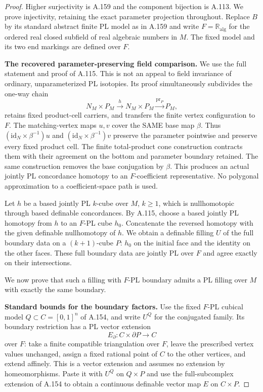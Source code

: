 \begin{proof}
Higher surjectivity is A.159 and the component bijection is
A.113. We prove injectivity, retaining the exact parameter
projection throughout. Replace $B$ by its standard abstract
finite PL model as in A.159 and write $F=\mathbb R_{\mathrm{alg}}$
for the ordered real closed subfield of real algebraic numbers
in $M$. The fixed model and its two end markings are defined
over $F$.

\textbf{The recovered parameter-preserving field comparison.}\quad
We use the full statement and proof of A.115. This is not an
appeal to field invariance of ordinary, unparameterized PL
isotopies. Its proof simultaneously subdivides the one-way
chain
\[
 N_M\times P_M\xrightarrow{h}N_M\times P_M
                  \xrightarrow{\operatorname{pr}_P}P_M,
\]
retains fixed product-cell carriers, and transfers the finite
vertex configuration to $F$. The matching-vertex maps $u,v$
cover the SAME base map $\beta$. Thus
$(\mathrm{id}_N\times\beta^{-1})u$ and
$(\mathrm{id}_N\times\beta^{-1})v$ preserve the parameter
pointwise and preserve every fixed product cell.
The finite total-product cone construction contracts them
with their agreement on the bottom and parameter boundary
retained. The same construction removes the base conjugation
by $\beta$. This produces an actual jointly PL concordance
homotopy to an $F$-coefficient representative. No polygonal
approximation to a coefficient-space path is used.

Let $h$ be a based jointly PL $k$-cube over $M$, $k\ge1$,
which is nullhomotopic through based definable concordances.
By A.115, choose a based jointly PL homotopy from $h$ to
an $F$-PL cube $h_0$. Concatenate the reversed homotopy
with the given definable nullhomotopy of $h$. We obtain a
definable filling $U$ of the full boundary data on a
$(k+1)$-cube $P$: $h_0$ on the initial face and the identity
on the other faces. These full boundary data are jointly PL
over $F$ and agree exactly on their intersections.

We now prove that such a filling with $F$-PL boundary admits
a PL filling over $M$ with exactly the same boundary.

\textbf{Standard bounds for the boundary factors.}\quad
Use the fixed $F$-PL cubical model $Q\subset C=[0,1]^n$ of
A.154, and write $U^Q$ for the conjugated family.
Its boundary restriction has a PL vector extension
\[
 E_\partial:C\times\partial P\longrightarrow C
\]
over $F$: take a finite compatible triangulation over $F$,
leave the prescribed vertex values unchanged, assign a
fixed rational point of $C$ to the other vertices, and
extend affinely. This is a vector extension and assumes
no extension by homeomorphisms. Paste it with $U^Q$ on
$Q\times P$ and use the full-subcomplex extension of A.154
to obtain a continuous definable vector map $E$ on $C\times P$.


\end{proof}
